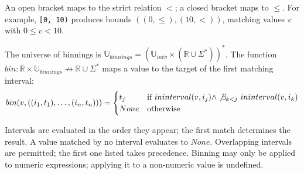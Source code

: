 An open bracket maps to the strict relation $<$; a closed bracket maps to $\leq$. For example, \texttt{[0, 10)} produces bounds $((0, \leq), (10, <))$, matching values $v$ with $0 \leq v < 10$.

\begin{frameddef}[Binning]
The universe of binnings is $\mathbb{U}_{binnings} = (\mathbb{U}_{intv} \times (\mathbb{R} \cup \Sigma^*))^*$. The function $bin : \mathbb{R} \times \mathbb{U}_{binnings} \nrightarrow \mathbb{R} \cup \Sigma^*$ maps a value to the target of the first matching interval:
\[
bin(v, ((i_1, t_1), \dots, (i_n, t_n))) = \begin{cases}
t_j & \text{if } ininterval(v, i_j) \land \not\exists_{k < j}\ ininterval(v, i_k) \\
None & \text{otherwise}
\end{cases}
\]
\end{frameddef}

Intervals are evaluated in the order they appear; the first match determines the result. A value matched by no interval evaluates to $None$. Overlapping intervals are permitted; the first one listed takes precedence. Binning may only be applied to numeric expressions; applying it to a non-numeric value is undefined.
